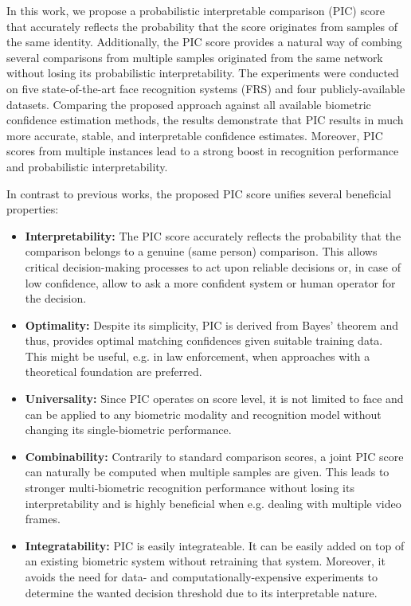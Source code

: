 \documentclass[10pt,twocolumn,letterpaper]{article}
\begin{document}
In this work, we propose a probabilistic interpretable comparison (PIC) score that accurately reflects the probability that the score originates from samples of the same identity.
Additionally, the PIC score provides a natural way of combing several comparisons from multiple samples originated from the same network without losing its probabilistic interpretability.
The experiments were conducted on five state-of-the-art face recognition systems (FRS) and four publicly-available datasets.
Comparing the proposed approach against all available biometric confidence estimation methods, the results demonstrate that PIC results in much more accurate, stable, and interpretable confidence estimates.
Moreover, PIC scores from multiple instances lead to a strong boost in recognition performance and probabilistic interpretability.

In contrast to previous works, the proposed PIC score unifies several beneficial properties:
\begin{itemize}
    \item \textbf{Interpretability:} The PIC score accurately reflects the probability that the comparison belongs to a genuine (same person) comparison. This allows critical decision-making processes to act upon reliable decisions or, in case of low confidence, allow to ask a more confident system or human operator for the decision.
    \item \textbf{Optimality:} Despite its simplicity, PIC is derived from Bayes' theorem and thus, provides optimal matching confidences given suitable training data. This might be useful, e.g. in law enforcement, when approaches with a theoretical foundation are preferred.
    \item \textbf{Universality:} Since PIC operates on score level, it is not limited to face and can be applied to any biometric modality and recognition model without changing its single-biometric performance. 
    \item \textbf{Combinability:} Contrarily to standard comparison scores, a joint PIC score can naturally be computed when multiple samples are given. This leads to stronger multi-biometric recognition performance without losing its interpretability and is highly beneficial when e.g. dealing with multiple video frames.
    \item \textbf{Integratability:} PIC is easily integrateable. It can be easily added on top of an existing biometric system without retraining that system. Moreover, it avoids the need for data- and computationally-expensive experiments to determine the wanted decision threshold due to its interpretable nature.
\end{itemize}
\end{document}
